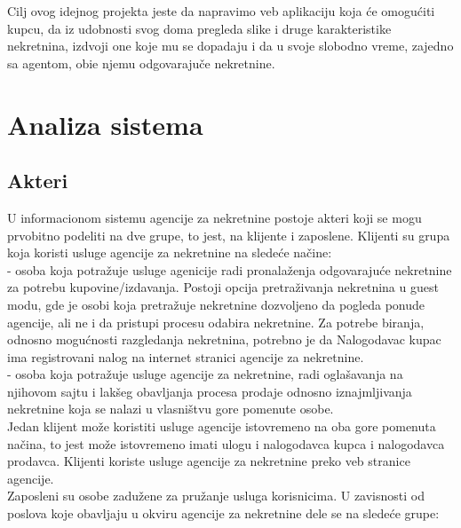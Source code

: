 \documentclass[20pt]{article}
\begin{document}
\indent Cilj ovog idejnog projekta jeste da napravimo veb aplikaciju koja \' ce omogu\' citi kupcu, da iz udobnosti svog doma pregleda slike i druge karakteristike nekretnina, izdvoji one koje mu se dopadaju i da u svoje slobodno vreme, zajedno sa agentom, obi\dj e njemu odgovaraju\v{c}e nekretnine.\\

\newpage
\section{\bfseries \Large Analiza sistema}
\subsection{\bfseries \Large Akteri}
\setlength{\parindent}{1cm}
\fontsize{13}{18} \selectfont 

\indent U informacionom sistemu agencije za nekretnine postoje akteri koji se mogu prvobitno podeliti na dve grupe, to jest, na klijente i zaposlene. Klijenti su grupa koja koristi usluge agencije za nekretnine na slede\' ce na\v {c}ine:\\

 - osoba koja potra\v {z}uje usluge agenicije radi pronala\v {z}enja odgovaraju\' ce nekretnine za potrebu kupovine/izdavanja. Postoji opcija pretra\v {z}ivanja nekretnina u guest modu, gde je osobi koja pretra\v {z}uje nekretnine dozvoljeno da pogleda ponude agencije, ali ne i da pristupi procesu odabira nekretnine. Za potrebe biranja, odnosno mogu\' cnosti razgledanja nekretnina, potrebno je da Nalogodavac kupac ima registrovani nalog na internet stranici agencije za nekretnine.\\

 - osoba koja potra\v {z}uje usluge agencije za nekretnine, radi ogla\v {s}avanja na njihovom sajtu i lak\v {s}eg obavljanja procesa prodaje odnosno iznajmljivanja nekretnine koja se nalazi u vlasni\v {s}tvu gore pomenute osobe.\\

Jedan klijent mo\v {z}e koristiti usluge agencije istovremeno na oba gore pomenuta na\v{c}ina, to jest mo\v{z}e istovremeno imati ulogu i nalogodavca kupca i nalogodavca prodavca. Klijenti koriste usluge agencije za nekretnine preko veb stranice agencije.\\

\indent Zaposleni su osobe zadu\v{z}ene za pru\v{z}anje usluga korisnicima. U zavisnosti od poslova koje obavljaju u okviru agencije za nekretnine dele se na slede\' ce grupe:\\
\end{document}
